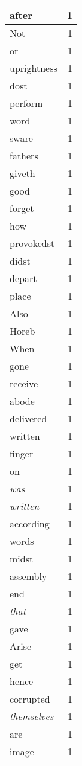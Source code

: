 \begin{center}
\begin{longtable}{l|r}
after & 1 \\ \hline
Not & 1 \\ \hline
or & 1 \\ \hline
uprightness & 1 \\ \hline
dost & 1 \\ \hline
perform & 1 \\ \hline
word & 1 \\ \hline
sware & 1 \\ \hline
fathers & 1 \\ \hline
giveth & 1 \\ \hline
good & 1 \\ \hline
forget & 1 \\ \hline
how & 1 \\ \hline
provokedst & 1 \\ \hline
didst & 1 \\ \hline
depart & 1 \\ \hline
place & 1 \\ \hline
Also & 1 \\ \hline
Horeb & 1 \\ \hline
When & 1 \\ \hline
gone & 1 \\ \hline
receive & 1 \\ \hline
abode & 1 \\ \hline
delivered & 1 \\ \hline
written & 1 \\ \hline
finger & 1 \\ \hline
on & 1 \\ \hline
\emph{was} & 1 \\ \hline
\emph{written} & 1 \\ \hline
according & 1 \\ \hline
words & 1 \\ \hline
midst & 1 \\ \hline
assembly & 1 \\ \hline
end & 1 \\ \hline
\emph{that} & 1 \\ \hline
gave & 1 \\ \hline
Arise & 1 \\ \hline
get & 1 \\ \hline
hence & 1 \\ \hline
corrupted & 1 \\ \hline
\emph{themselves} & 1 \\ \hline
are & 1 \\ \hline
image & 1 \\ \hline

\end{longtable}
\end{center}
